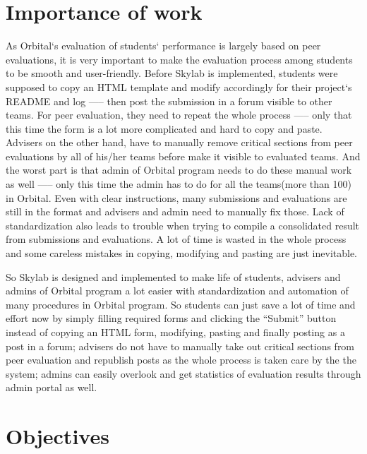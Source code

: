 \section{Importance of work}
As Orbital`s evaluation of students` performance is largely based on peer evaluations, it is very important to make the evaluation process among students to be smooth and user-friendly. Before Skylab is implemented, students were supposed to copy an HTML template and modify accordingly for their project`s README and log —-- then post the submission in a forum visible to other teams. For peer evaluation, they need to repeat the whole process —-- only that this time the form is a lot more complicated and hard to copy and paste. Advisers on the other hand, have to manually remove critical sections from peer evaluations by all of his/her teams before make it visible to evaluated teams. And the worst part is that admin of Orbital program needs to do these manual work as well —-- only this time the admin has to do for all the teams(more than 100) in Orbital. Even with clear instructions, many submissions and evaluations are still in the format and advisers and admin need to manually fix those. Lack of standardization also leads to trouble when trying to compile a consolidated result from submissions and evaluations. A lot of time is wasted in the whole process and some careless mistakes in copying, modifying and pasting are just inevitable. 

So Skylab is designed and implemented to make life of students, advisers and admins of Orbital program a lot easier with standardization and automation of many procedures in Orbital program. So students can just save a lot of time and effort now by simply filling required forms and clicking the ``Submit'' button instead of copying an HTML form, modifying, pasting and finally posting as a post in a forum; advisers do not have to manually take out critical sections from peer evaluation and republish posts as the whole process is taken care by the the system; admins can easily overlook and get statistics of evaluation results through admin portal as well.

\section{Objectives}

